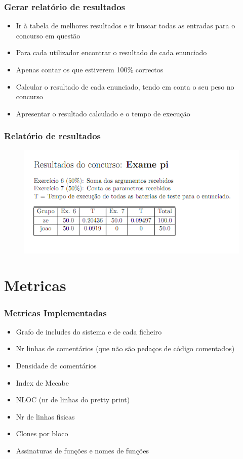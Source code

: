 \documentclass{beamer}
\begin{document}
\begin{frame} \frametitle{Gerar relatório de resultados}
\begin{itemize}
\item Ir à tabela de melhores resultados e ir buscar todas as entradas para o concurso em questão
\item Para cada utilizador encontrar o resultado de cada enunciado
\item Apenas contar os que estiverem 100\% correctos
\item Calcular o resultado de cada enunciado, tendo em conta o seu peso no concurso
\item Apresentar o resultado calculado e o tempo de execução
\end{itemize}
\end{frame}

\begin{frame} \frametitle{Relatório de resultados}
\begin{figure}[h]
\begin{center}
\includegraphics[scale=0.5]{imagens/relatorio.png}
\end{center}
\end{figure}
\end{frame}


\section{Metricas}
\begin{frame} \frametitle{Metricas Implementadas}
\begin{itemize}
\item Grafo de includes do sistema e de cada ficheiro
\item Nr linhas de comentários (que não são pedaços de código comentados)
\item Densidade de comentários
\item Index de Mccabe
\item NLOC (nr de linhas do pretty print)
\item Nr de linhas fisicas
\item Clones por bloco
\item Assinaturas de funções e nomes de funções
\end{itemize}
\end{frame}
\end{document}
